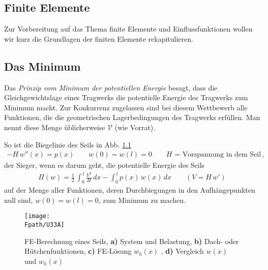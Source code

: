\textcolor{chapterTitleBlue}{\chapter{Finite Elemente}}\label{Chap3}
Zur Vorbereitung auf das Thema finite Elemente und Einflussfunktionen wollen wir kurz die Grundlagen der finiten Elemente rekapitulieren.

{\textcolor{sectionTitleBlue}{\section{Das Minimum}}}
Das {\em Prinzip vom Minimum der potentiellen Energie\/} besagt, dass die Gleichgewichtslage eines Tragwerks die potentielle Energie des Tragwerks zum Minimum macht. Zur Konkurrenz zugelassen sind bei diesem Wettbewerb alle Funktionen, die die geometrischen Lagerbedingungen des Tragwerks erf\"{u}llen. Man nennt diese Menge \"{u}blicherweise $\mathcal{V}$ (wie  \glq Vorrat\grq{}).

So ist die Biegelinie des Seils in Abb. \ref{U33}
\begin{align}\label{Eq88}
- H\,w''(x) = p(x) \qquad w(0) = w(l) = 0 \qquad \text{$H$ = Vorspannung in dem Seil}\,,
\end{align}
der Sieger, wenn es darum geht, die potentielle Energie des Seils
\begin{align}
\Pi(w) = \frac{1}{2}\,\int_0^{\,l} \frac{V^2}{H}\,dx - \int_0^{\,l} p(x)\,w(x)\,dx \qquad (V = H\,w')
\end{align}
auf der Menge aller Funktionen, deren Durchbiegungen in den Aufh\"{a}ngepunkten null sind, $w(0) = w(l) = 0$, zum Minimum zu machen.

\begin{figure}[tbp]
\centering
\if {} \sidecaption[t] \fi
\texttt{[image: \\Fpath/U33A]}
\caption{FE-Berechnung eines Seils, \textbf{a)} System und Belastung, \textbf{ b)} Dach- oder H\"{u}tchenfunktionen, \textbf{ c)} FE-L\"{o}sung $w_h(x)$ ,
\textbf{ d)} Vergleich $w(x)$ und $w_h(x)$} \label{U33}
\end{figure}%

